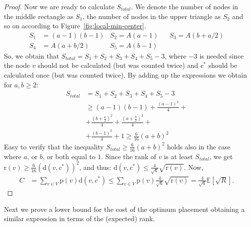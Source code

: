 \documentclass[conference]{IEEEtran}
\def\E{\mathbb{E}}
\def\d{\mathrm{d}}
\def\p{\mathrm{p}}
\def\r{\mathrm{r}}
\begin{document}
\begin{proof}
Now we are ready to calculate $S_{total}$. We denote the number of nodes in the middle rectangle as $S_1$, the number of nodes in the upper triangle as $S_2$ and so on according to Figure~\ref{fig:local-min-center}.
\begin{align*}
S_1&=(a-1)(b-1) &S_2=A(a-1) && S_3=A(b+a/2)\\
S_4&=A(a+b/2)   &S_5=A(b-1) 
\end{align*}
So, we obtain that $S_{total}=S_1+S_2+S_3+S_4+S_5-3$, where $-3$ is needed since the node $v$ should not be calculated (but was counted twice) and $c^*$ should be calculated once (but was counted twice).
By adding up the expressions we obtain for $a,b\ge2$:
\begin{align*}
S_{total}&=S_1+S_2+S_3+S_4+S_5-3\\
&\ge(a-1)(b-1)+ \frac{(a-1)^2}{4} + \\
&+\frac{(b+\tfrac{a}{2})^2}{4}+ \frac{(a+\tfrac{b}{2})^2}{4}+\\
&+ \frac{(b-1)^2}{4}+1
\ge\tfrac{6}{16}(a+b)^2
\end{align*}
Easy to verify that the inequality $S_{total}\ge\tfrac{6}{16}(a+b)^2$ holds also in the case where $a$, or $b$, or both equal to $1$.
Since the rank of $v$ is at least $S_{total}$, we get $\r(v)\ge\tfrac{6}{16}(\d(v,c^*))^2$, and thus: $\d(v,c^*)\le\tfrac{4}{\sqrt{6}}\sqrt{\r(v)}$. Now,
\begin{align*}
C&=\sum_{v\in V}\p(v)\d(v,c^*)\le\sum_{v\in V}\p(v) \tfrac{4}{\sqrt{6}}\sqrt{\r(v)}
=\tfrac{4}{\sqrt{6}}\E[\sqrt{R}].
\end{align*}
\end{proof}




Next we prove a lower bound for the cost of the optimum placement obtaining a similar expression in terms of the (expected) rank.
\end{document}
